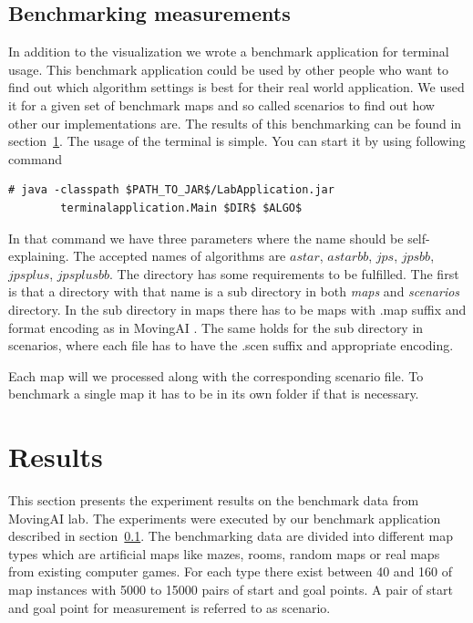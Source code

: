 \documentclass{article}
\begin{document}
    
    
    \subsection{Benchmarking measurements}
    \label{sec:benchmarking}
    
    In addition to the visualization we wrote a benchmark application for terminal usage. This benchmark application could be used by other people who want to find out which algorithm settings is best for their real world application. We used it for a given set of benchmark maps and so called scenarios to find out how other our implementations are. The results of this benchmarking can be found in section~\ref{sec:results}. The usage of the terminal is simple. You can start it by using following command
    
    \begin{lstlisting}[basicstyle=\small\ttfamily]
      # java -classpath $PATH_TO_JAR$/LabApplication.jar
        terminalapplication.Main $DIR$ $ALGO$
    \end{lstlisting}
    
    In that command we have three parameters where the name should be self-explaining. The accepted names of algorithms are $astar$, $astarbb$, $jps$, $jpsbb$, $jpsplus$, $jpsplusbb$. The directory has some requirements to be fulfilled. The first is that a directory with that name is a sub directory in both \textit{maps} and \textit{scenarios} directory. In the sub directory in maps there has to be maps with .map suffix and format encoding as in MovingAI \cite{sturtevant2012benchmarks}. The same holds for the sub directory in scenarios, where each file has to have the .scen suffix and appropriate encoding.
    
    Each map will we processed along with the corresponding scenario file. To benchmark a single map it has to be in its own folder if that is necessary.
    
    
    
    \section{Results}
    \label{sec:results}
    
    This section presents the experiment results on the benchmark data from MovingAI lab.\cite{sturtevant2012benchmarks} The experiments were executed by our benchmark application described in section~\ref{sec:benchmarking}. The benchmarking data are divided into different map types which are artificial maps like mazes, rooms, random maps or real maps from existing computer games. For each type there exist between 40 and 160 of map instances with 5000 to 15000 pairs of start and goal points. A pair of start and goal point for measurement is referred to as scenario.
    
\end{document}
